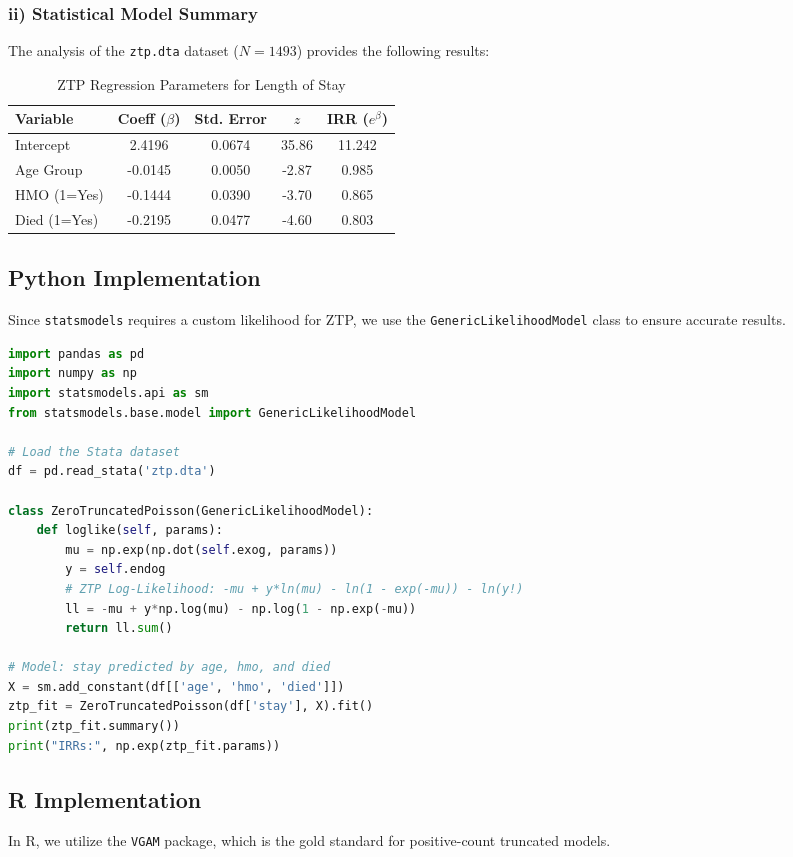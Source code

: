 \documentclass[12pt, a4paper]{article}
\begin{document}
\subsubsection{ii) Statistical Model Summary}
The analysis of the \texttt{ztp.dta} dataset ($N=1493$) provides the following results:
\begin{table}[h!]
\centering
\caption{ZTP Regression Parameters for Length of Stay}
\begin{tabular}{@{}lcccc@{}}
\toprule
Variable & Coeff ($\beta$) & Std. Error & $z$ & IRR ($e^\beta$) \\ \midrule
Intercept & 2.4196 & 0.0674 & 35.86 & 11.242 \\
Age Group & -0.0145 & 0.0050 & -2.87 & 0.985 \\
HMO (1=Yes) & -0.1444 & 0.0390 & -3.70 & 0.865 \\
Died (1=Yes) & -0.2195 & 0.0477 & -4.60 & 0.803 \\ \bottomrule
\end{tabular}
\end{table}

\subsection{Python Implementation}
Since \texttt{statsmodels} requires a custom likelihood for ZTP, we use the \texttt{GenericLikelihoodModel} class to ensure accurate results.

\begin{lstlisting}[language=Python, caption=Python implementation for ZTP]
import pandas as pd
import numpy as np
import statsmodels.api as sm
from statsmodels.base.model import GenericLikelihoodModel

# Load the Stata dataset
df = pd.read_stata('ztp.dta')

class ZeroTruncatedPoisson(GenericLikelihoodModel):
    def loglike(self, params):
        mu = np.exp(np.dot(self.exog, params))
        y = self.endog
        # ZTP Log-Likelihood: -mu + y*ln(mu) - ln(1 - exp(-mu)) - ln(y!)
        ll = -mu + y*np.log(mu) - np.log(1 - np.exp(-mu))
        return ll.sum()

# Model: stay predicted by age, hmo, and died
X = sm.add_constant(df[['age', 'hmo', 'died']])
ztp_fit = ZeroTruncatedPoisson(df['stay'], X).fit()
print(ztp_fit.summary())
print("IRRs:", np.exp(ztp_fit.params))
\end{lstlisting}

\subsection{R Implementation}
In R, we utilize the \texttt{VGAM} package, which is the gold standard for positive-count truncated models.
\end{document}
